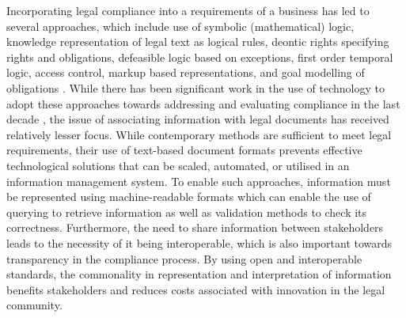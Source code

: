 Incorporating legal compliance into a requirements of a business has led to several approaches, which include use of symbolic (mathematical) logic, knowledge representation of legal text as logical rules, deontic rights specifying rights and obligations, defeasible logic based on exceptions, first order temporal logic, access control, markup based representations, and goal modelling of obligations \cite{otto_addressing_2007}.
While there has been significant work in the use of technology to adopt these approaches towards addressing and evaluating compliance in the last decade \cite{sadiq_modeling_2007,otto_addressing_2007,gordon_rules_2009,fellmann_state---art_2014,benyoucef_information_2015,elgammal_formalizing_2016,kirrane_access_2016}, the issue of associating information with legal documents has received relatively lesser focus.
While contemporary methods are sufficient to meet legal requirements, their use of text-based document formats prevents effective technological solutions that can be scaled, automated, or utilised in an information management system. To enable such approaches, information must be represented using machine-readable formats which can enable the use of querying to retrieve information as well as validation methods to check its correctness. Furthermore, the need to share information between stakeholders leads to the necessity of it being interoperable, which is also important towards transparency in the compliance process. By using open and interoperable standards, the commonality in representation and interpretation of information benefits stakeholders and reduces costs associated with innovation in the legal community.

